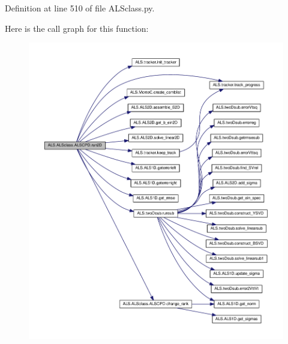Definition at line 510 of file A\+L\+Sclass.\+py.



Here is the call graph for this function\+:
\nopagebreak
\begin{figure}[H]
\begin{center}
\leavevmode
\includegraphics[width=350pt]{class_a_l_s_1_1_a_l_sclass_1_1_a_l_s_c_p_d_ad3ac941a83ff0e755fd91bb131773e5f_cgraph}
\end{center}
\end{figure}


